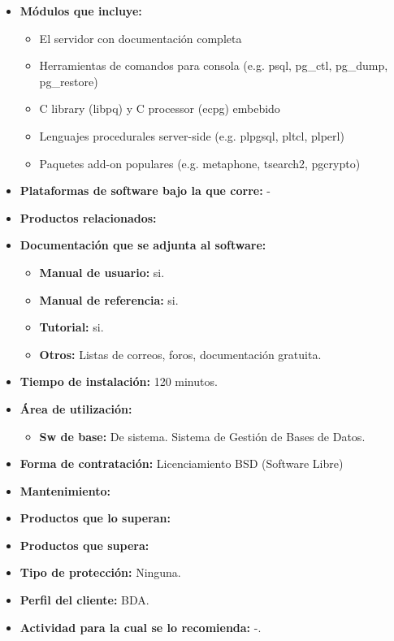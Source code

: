\begin{itemize}
  \item \textbf{Módulos que incluye:} 
      \begin{itemize}
          \item El servidor con documentación completa
	  \item Herramientas de comandos para consola (e.g. psql, pg\_ctl, pg\_dump, pg\_restore)
          \item C library (libpq)  y C processor (ecpg) embebido
          \item Lenguajes procedurales server-side (e.g. plpgsql, pltcl, plperl)
          \item Paquetes add-on populares (e.g. metaphone, tsearch2, pgcrypto)
       \end{itemize}
  \item \textbf{Plataformas de software bajo la que corre:} -
  \item \textbf{Productos relacionados:} 

  \item \textbf{Documentación que se adjunta al software:}
    \begin{itemize}
      \item \textbf{Manual de usuario:} si.
      \item \textbf{Manual de referencia:} si.
      \item \textbf{Tutorial:} si.
      \item \textbf{Otros:} Listas de correos, foros, documentación gratuita.
    \end{itemize}

  \item \textbf{Tiempo de instalación:} 120 minutos.

  \item \textbf{Área de utilización:}
    \begin{itemize}
      \item \textbf{Sw de base:} De sistema. Sistema de Gestión de Bases de Datos.
    \end{itemize}

  \item \textbf{Forma de contratación:} Licenciamiento BSD (Software Libre)
  \item \textbf{Mantenimiento:} 
  \item \textbf{Productos que lo superan:} 
  \item \textbf{Productos que supera:} 
  \item \textbf{Tipo de protección:} Ninguna.
  \item \textbf{Perfil del cliente:} BDA.
  \item \textbf{Actividad para la cual se lo recomienda:} -.
\end{itemize}

